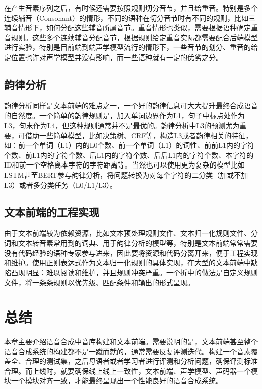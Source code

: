 \documentclass[cn,10pt,math=newtx,citestyle=gb7714-2015,bibstyle=gb7714-2015]{elegantbook}
\begin{document}
在产生音素序列之后，有时候还需要按照规则切分音节，并且给重音。特别是多个连续辅音（Consonant）的情形，不同的语种在切分音节时有不同的规则，比如三辅音情形下，如何分配这些辅音所属音节。重音情形也类似，需要根据语种确定重音规则。这些多个连续辅音分配音节，根据规则给定重音实际都需要配合后端模型进行实验，特别是目前端到端声学模型流行的情形下，一些音节的划分、重音的给定位置也许对声学模型并没有影响，而一些语种就有一定的优劣之分。

\subsection{韵律分析}

韵律分析同样是文本前端的难点之一，一个好的韵律信息可大大提升最终合成语音的自然度。一个简单的韵律规则是，加入单词边界作为L1，句子中标点处作为L3，句末作为L4，但这种规则通常并不是最优的。韵律分析中L3的预测尤为重要，可借助一些简单模型，比如决策树、CRF等，构造L3或者韵律相关的特征，如：前一个单词（L1）内的L0个数、前一个单词（L1）的词性、前前L1内的字符个数、前L1内的字符个数、后L1内的字符个数、后后L1内的字符个数、本字符的ID和前一个空格离本字符的字符距离等。当然也可以使用更为复杂的模型比如LSTM甚至BERT参与韵律分析，将问题转换为对每个字符的二分类（加或不加L3）或者多分类任务（L0/L1/L3）。

\subsection{文本前端的工程实现}

由于文本前端较为依赖资源，比如文本预处理规则文件、文本归一化规则文件、分词和文本转音素常用到的词典、用于韵律分析的模型等，特别是文本前端常常需要没有代码经验的语种专家参与进来，因此要将资源和代码分离开来，便于工程实现和维护。使用正则表达式作为文本归一化规则的具体实现，在大型的文本前端中缺陷凸现明显：难以阅读和维护，并且规则冲突严重。一个折中的做法是自定义规则文件，将一条条规则以优先级、匹配条件和输出的形式呈现。

\section{总结}

本章主要介绍语音合成中音库构建和文本前端。需要说明的是，文本前端甚至整个语音合成系统的构建都不是一蹴而就的，通常需要反复评测迭代。构建一个音素覆盖全、合理的测试集，之后母语者或者学习者进行评测和分析问题，确保评测标准合理。而上线时，就要确保线上线上一致性，文本前端、声学模型、声码器一个模块一个模块对齐一致，才能最终呈现出一个性能良好的语音合成系统。
\end{document}
